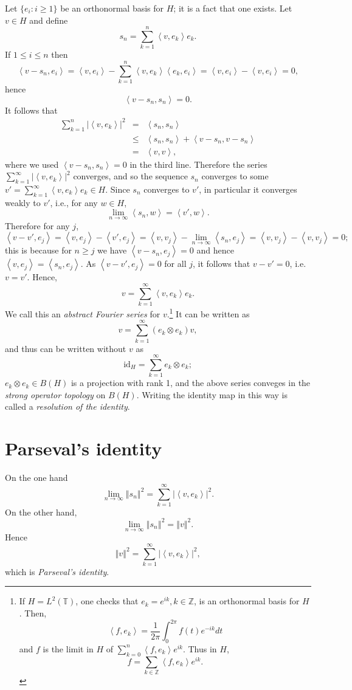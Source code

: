 \documentclass{article}
\newcommand{\inner}[2]{\left\langle #1, #2 \right\rangle}
\newcommand{\id}{\textrm{id}}
\newcommand{\norm}[1]{\left\Vert #1 \right\Vert}
\begin{document}
Let $\{e_i:i \geq 1\}$ be an orthonormal basis for $H$; it is a fact that one exists. 
Let $v \in H$ and define
\[
s_n=\sum_{k=1}^n \inner{v}{e_k}e_k.
\]
If $1 \leq i \leq n$ then
\[
\inner{v-s_n}{e_i}=\inner{v}{e_i} - \sum_{k=1}^n \inner{v}{e_k}\inner{e_k}{e_i}
=\inner{v}{e_i}-\inner{v}{e_i}=0,
\]
hence
\[
\inner{v-s_n}{s_n}=0.
\]
It follows that
\begin{eqnarray*}
\sum_{k=1}^n |\inner{v}{e_k}|^2&=&\inner{s_n}{s_n}\\
&\leq&\inner{s_n}{s_n}+\inner{v-s_n}{v-s_n}\\
&=&\inner{v}{v},
\end{eqnarray*}
where we used $\inner{v-s_n}{s_n}=0$ in the third line.
Therefore the series $\sum_{k=1}^\infty |\inner{v}{e_k}|^2$ converges, and so the sequence $s_n$ converges to some
$v'=\sum_{k=1}^\infty \inner{v}{e_k}e_k \in H$. Since $s_n$ converges to $v'$, in particular it converges weakly to $v'$, i.e., for
any $w \in H$,
\[
\lim_{n \to \infty} \inner{s_n}{w}=\inner{v'}{w}.
\]
Therefore for any $j$,
\[
\inner{v-v'}{e_j}=\inner{v}{e_j}-\inner{v'}{e_j}=\inner{v}{v_j}-\lim_{n \to \infty} \inner{s_n}{e_j}
=\inner{v}{v_j}-\inner{v}{v_j}=0;
\]
this is because for $n \geq j$ we have $\inner{v-s_n}{e_j}=0$ and hence $\inner{v}{e_j}=\inner{s_n}{e_j}$.
As $\inner{v-v'}{e_j}=0$ for all $j$, it follows that $v-v'=0$, i.e. $v=v'$. Hence,
\[
v = \sum_{k=1}^\infty \inner{v}{e_k}e_k.
\]
We call this an {\em abstract Fourier series} for $v$.\footnote{If $H=L^2(\mathbb{T})$,
one checks that
$e_k=e^{ik}, k \in \mathbb{Z}$, is an orthonormal basis for $H$.
Then,
\[
\inner{f}{e_k}=\frac{1}{2\pi} \int_0^{2\pi} f(t) e^{-ik} dt
\]
and $f$ is the limit in $H$ of $\sum_{k=0}^n \inner{f}{e_k} e^{ik}$. Thus in $H$,
\[
f=\sum_{k \in \mathbb{Z}} \inner{f}{e_k} e^{ik}.
\]
}
It can be written as
\[
v= \sum_{k=1}^\infty (e_k \otimes e_k)v,
\]
and thus can be written without $v$ as
\[
\id_H = \sum_{k=1}^\infty e_k \otimes e_k;
\]
$e_k \otimes e_k \in B(H)$ is a projection with rank 1, and the above series conveges in the {\em strong operator topology} on $B(H)$.
Writing the identity map in this way is called a {\em resolution of the identity}.

\section{Parseval's identity}
On the one hand
\[
\lim_{n \to \infty} \norm{s_n}^2 = \sum_{k=1}^\infty |\inner{v}{e_k}|^2.
\]
On the other hand,
\[
\lim_{n \to \infty} \norm{s_n}^2 = \norm{v}^2.
\]
Hence
\[
\norm{v}^2 = \sum_{k=1}^\infty |\inner{v}{e_k}|^2,
\]
which is {\em Parseval's identity}. 
\end{document}
